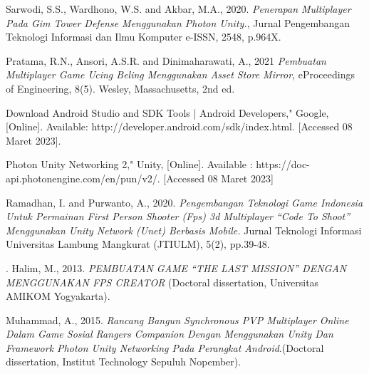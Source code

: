 \documentclass[12pt,a4paper]{report}
\begin{document}



\tableofcontents
{}


\listoftables
\listoffigures



\clearpage

\setcounter{page}{1}







\begin{thebibliography}{9}
Sarwodi, S.S., Wardhono, W.S. and Akbar, M.A., 2020. \emph{Penerapan Multiplayer Pada Gim Tower Defense Menggunakan Photon Unity.}, Jurnal Pengembangan Teknologi Informasi dan Ilmu Komputer e-ISSN, 2548, p.964X.

Pratama, R.N., Ansori, A.S.R. and Dinimaharawati, A., 2021 \emph{Pembuatan Multiplayer Game Ucing Beling Menggunakan Asset Store Mirror}, eProceedings of Engineering, 8(5).
Wesley, Massachusetts, 2nd ed.

Download Android Studio and SDK Tools | Android 
Developers," Google, [Online]. Available: 
http://developer.android.com/sdk/index.html. [Accessed 08 
Maret 2023].

Photon Unity Networking 2," Unity, 
[Online]. Available : https://doc-api.photonengine.com/en/pun/v2/. [Accessed 08 Maret 2023]

Ramadhan, I. and Purwanto, A., 2020. \emph{Pengembangan Teknologi Game Indonesia Untuk Permainan First Person Shooter (Fps) 3d Multiplayer “Code To Shoot” Menggunakan Unity Network (Unet) Berbasis Mobile.} Jurnal Teknologi Informasi Universitas Lambung Mangkurat (JTIULM), 5(2), pp.39-48.

. 
Halim, M., 2013. \emph{PEMBUATAN GAME “THE LAST MISSION” DENGAN MENGGUNAKAN FPS CREATOR} (Doctoral dissertation, Universitas AMIKOM Yogyakarta).

Muhammad, A., 2015. \emph{Rancang Bangun Synchronous PVP Multiplayer Online Dalam Game Sosial Rangers Companion Dengan Menggunakan Unity Dan Framework Photon Unity Networking Pada Perangkat Android}.(Doctoral dissertation, Institut Technology Sepuluh Nopember).
\end{thebibliography}
\end{document}
